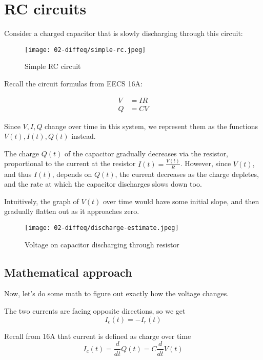 \documentclass[11pt]{article}
\begin{document}
\maketitle
\tableofcontents
\newpage

\section{RC circuits}

Consider a charged capacitor that is slowly discharging through this circuit:

\begin{figure}[H]
    \centering
        \texttt{[image: 02-diffeq/simple-rc.jpeg]}
    \caption{Simple RC circuit}
\end{figure}

Recall the circuit formulas from EECS 16A:

\begin{align}
    V&=IR\\
    Q&=CV
\end{align}

Since $V,I,Q$ change over time in this system, we represent them as the functions $V(t),I(t),Q(t)$ instead.

The charge $Q(t)$ of the capacitor gradually decreases via the resistor, proportional to the current at the resistor $I(t)=\frac{V(t)}{R}$. However, since $V(t)$, and thus $I(t)$, depends on $Q(t)$, the current decreases as the charge depletes, and the rate at which the capacitor discharges slows down too. 

Intuitively, the graph of $V(t)$ over time would have some initial slope, and then gradually flatten out as it approaches zero.

\begin{figure}[H]
    \centering
        \texttt{[image: 02-diffeq/discharge-estimate.jpeg]}
    \caption{Voltage on capacitor discharging through resistor}
\end{figure}

\subsection{Mathematical approach}
Now, let's do some math to figure out exactly how the voltage changes.

The two currents are facing opposite directions, so we get \[I_c(t)=-I_r(t)\]

Recall from 16A that current is defined as charge over time \[I_c(t)=\frac d{dt}Q(t)=C\frac d{dt}V(t)\]
\end{document}
